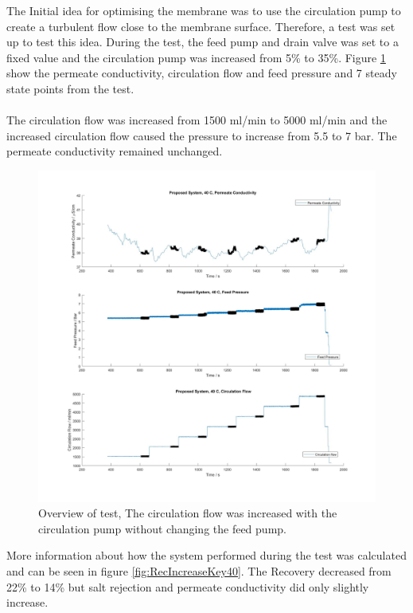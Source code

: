 The Initial idea for optimising the membrane was to use the circulation pump to create a turbulent flow close to the membrane surface. Therefore, a test was set up to test this idea.
During the test, the feed pump and drain valve was set to a fixed value and the circulation pump was increased from 5\% to 35\%. Figure \ref{fig:RecIncrease40} show the permeate conductivity, circulation flow and feed pressure and 7 steady state points from the test.\\
\\
The circulation flow was increased from 1500 ml/min to 5000 ml/min and the increased circulation flow caused the pressure to increase from 5.5 to 7 bar. The permeate conductivity remained unchanged. 
\begin{figure}[H]
    \centering
    \includegraphics[width=1\textwidth]{RecIncrease40}
    \caption{Overview of test, The circulation flow was increased with the circulation pump without changing the feed pump.}
    \label{fig:RecIncrease40}
\end{figure}  
More information about how the system performed during the test was calculated and can be seen in figure \ref{fig:RecIncreaseKey40}. The Recovery decreased from 22\% to 14\%  but salt rejection and permeate conductivity did only slightly increase. \\
\\
